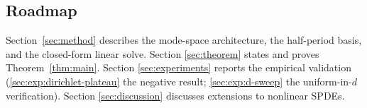 \subsection{Roadmap}
\label{sec:intro:roadmap}

Section~\ref{sec:method} describes the mode-space architecture, the
half-period basis, and the closed-form linear solve. Section
\ref{sec:theorem} states and proves Theorem~\ref{thm:main}. Section
\ref{sec:experiments} reports the empirical validation
(\ref{sec:exp:dirichlet-plateau} the negative result;
\ref{sec:exp:d-sweep} the uniform-in-$d$ verification). Section
\ref{sec:discussion} discusses extensions to nonlinear SPDEs.
